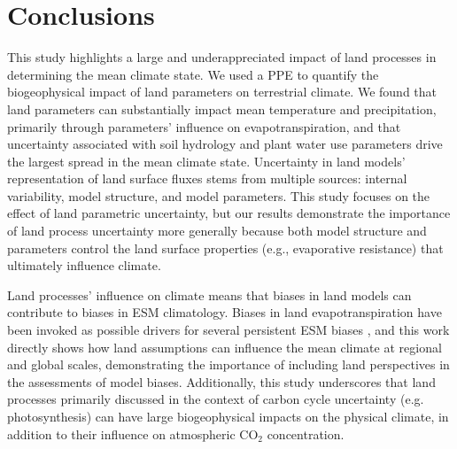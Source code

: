 \documentclass[draft]{agujournal2019}
\begin{document}
\section{Conclusions}
This study highlights a large and underappreciated impact of land processes in determining the mean climate state. We used a PPE to quantify the biogeophysical impact of land parameters on terrestrial climate. We found that land parameters can substantially impact mean temperature and precipitation, primarily through parameters’ influence on evapotranspiration, and that uncertainty associated with soil hydrology and plant water use parameters drive the largest spread in the mean climate state. Uncertainty in land models' representation of land surface fluxes stems from multiple sources: internal variability, model structure, and model parameters. This study focuses on the effect of land parametric uncertainty, but our results demonstrate the importance of land process uncertainty more generally because both model structure and parameters control the land surface properties (e.g., evaporative resistance) that ultimately influence climate.

Land processes’ influence on climate means that biases in land models can contribute to biases in ESM climatology. Biases in land evapotranspiration have been invoked as possible drivers for several persistent ESM biases \citep[e.g., the central United States warm and dry summer biases,][]{klein_diagnosis_2006, cheruy_role_2014, williams_land-atmosphere_2016, lin_causes_2017, morcrette_introduction_2018, zhang_causes_2018, ma_causes_2018, mueller_systematic_2014}, and this work directly shows how land assumptions can influence the mean climate at regional and global scales, demonstrating the importance of including land perspectives in the assessments of model biases. Additionally, this study underscores that land processes primarily discussed in the context of carbon cycle uncertainty (e.g. photosynthesis) can have large biogeophysical impacts on the physical climate, in addition to their influence on atmospheric CO$_2$ concentration.
\end{document}
